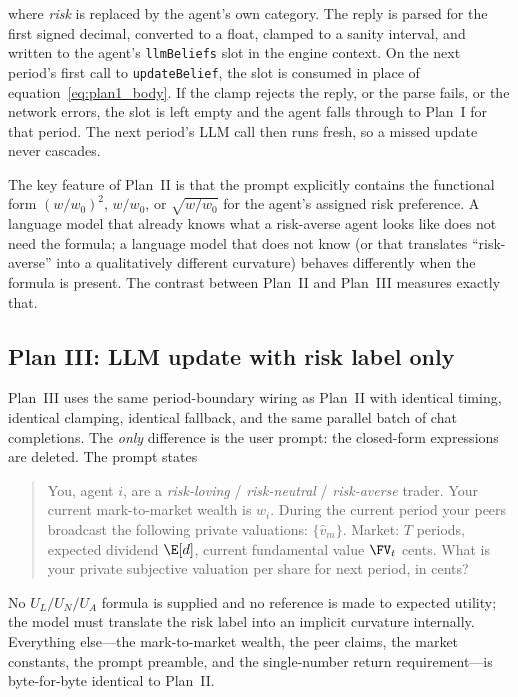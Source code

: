 where \emph{risk} is replaced by the agent's own category. The
reply is parsed for the first signed decimal, converted to a float,
clamped to a sanity interval, and written to the agent's
\texttt{llmBeliefs} slot in the engine context. On the next period's
first call to \texttt{updateBelief}, the slot is consumed in place
of equation~\eqref{eq:plan1_body}. If the clamp rejects the reply,
or the parse fails, or the network errors, the slot is left empty
and the agent falls through to Plan~I for that period. The next
period's LLM call then runs fresh, so a missed update never cascades.

The key feature of Plan~II is that the prompt explicitly contains
the functional form $(w/w_0)^2$, $w/w_0$, or $\sqrt{w/w_0}$ for
the agent's assigned risk preference. A language model that
already knows what a risk-averse agent looks like does not need
the formula; a language model that does not know (or that
translates ``risk-averse'' into a qualitatively different
curvature) behaves differently when the formula is present. The
contrast between Plan~II and Plan~III measures exactly that.

\subsection{Plan III: LLM update with risk label only}
\label{sec:plan3}

Plan~III uses the same period-boundary wiring as Plan~II with
identical timing, identical clamping, identical fallback, and the
same parallel batch of chat completions. The \emph{only} difference
is the user prompt: the closed-form expressions are deleted. The
prompt states
\begin{quote}\small
You, agent $i$, are a \emph{risk-loving} / \emph{risk-neutral} /
\emph{risk-averse} trader. Your current mark-to-market wealth is
$w_i$. During the current period your peers broadcast the following
private valuations: $\{\hat v_m\}$. Market: $T$ periods, expected
dividend $\E[d]$, current fundamental value $\FV_t$ cents. What is
your private subjective valuation per share for next period, in
cents?
\end{quote}
No $U_L / U_N / U_A$ formula is supplied and no reference is made
to expected utility; the model must translate the risk label into
an implicit curvature internally. Everything else---the mark-to-market
wealth, the peer claims, the market constants, the prompt preamble,
and the single-number return requirement---is byte-for-byte
identical to Plan~II.

